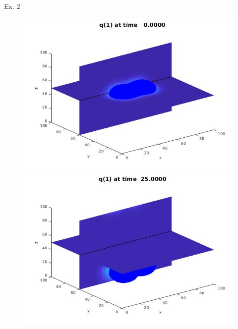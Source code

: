      \begin{frame}{Ex. 2}
    	\scriptsize
    	\begin{figure}[H]
    		\centering
    		\begin{minipage}{0.4\textwidth}
    			\includegraphics[scale=0.21]{Bilder_3D/2Glocken_wxi_wyj_wzi_2Cluster_t=0}
    		\end{minipage}
    		\hfill 
    		\begin{minipage}{0.4\textwidth}
    			\includegraphics[scale=0.21]{Bilder_3D/2Glocken_wxi_wyj_wzi_2Cluster_t=25}

\end{minipage}
\end{figure}
\end{frame}
